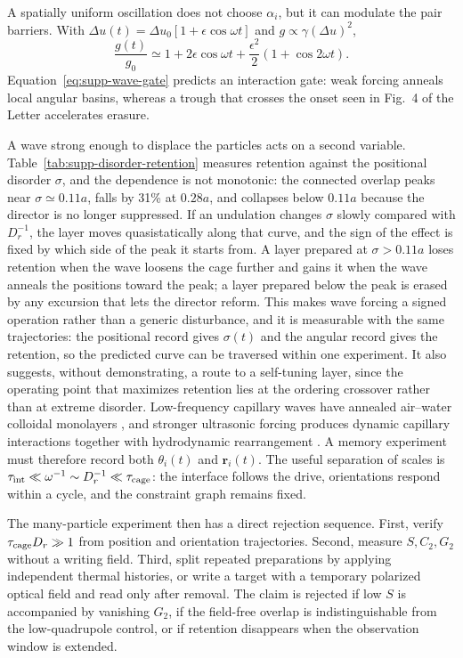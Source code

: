 \documentclass[aps,prl,onecolumn,superscriptaddress,nofootinbib]{revtex4-2}
\begin{document}
A spatially uniform oscillation does not choose \(\alpha_i\), but it can
modulate the pair barriers.  With
\(\Delta u(t)=\Delta u_0[1+\epsilon\cos\omega t]\) and
\(g\propto\gamma(\Delta u)^2\),
\begin{equation}
 \frac{g(t)}{g_0}\simeq
 1+2\epsilon\cos\omega t+
 \frac{\epsilon^2}{2}\left(1+\cos2\omega t\right).
 \label{eq:supp-wave-gate}
\end{equation}
Equation~\eqref{eq:supp-wave-gate} predicts an interaction gate: weak forcing
anneals local angular basins, whereas a trough that crosses the onset seen in
Fig.~4 of the Letter accelerates erasure.

A wave strong enough to displace the particles acts on a second variable.
Table~\ref{tab:supp-disorder-retention} measures retention against the
positional disorder \(\sigma\), and the dependence is not monotonic: the
connected overlap peaks near \(\sigma\simeq0.11a\), falls by 31\% at
\(0.28a\), and collapses below \(0.11a\) because the director is no longer
suppressed.  If an undulation changes \(\sigma\) slowly compared with
\(D_r^{-1}\), the layer moves quasistatically along that curve, and the sign
of the effect is fixed by which side of the peak it starts from.  A layer
prepared at \(\sigma>0.11a\) loses retention when the wave loosens the cage
further and gains it when the wave anneals the positions toward the peak; a
layer prepared below the peak is erased by any excursion that lets the
director reform.  This makes wave forcing a signed operation rather than a
generic disturbance, and it is measurable with the same trajectories: the
positional record gives \(\sigma(t)\) and the angular record gives the
retention, so the predicted curve can be traversed within one experiment.  It
also suggests, without demonstrating, a route to a self-tuning layer, since
the operating point that maximizes retention lies at the ordering crossover
rather than at extreme disorder.  Low-frequency capillary waves
have annealed air--water colloidal monolayers \cite{caso2025}, and stronger
ultrasonic forcing produces dynamic capillary interactions together with
hydrodynamic rearrangement \cite{huerre2018}.  A memory experiment must
therefore record both \(\theta_i(t)\) and \(\bm r_i(t)\).  The useful
separation of scales is
\(\tau_{\rm int}\ll\omega^{-1}\sim D_r^{-1}\ll\tau_{\rm cage}\): the
interface follows the drive, orientations respond within a cycle, and the
constraint graph remains fixed.

The many-particle experiment then has a direct rejection sequence.  First,
verify \(\tau_{\rm cage}D_r\gg1\) from position and orientation trajectories.
Second, measure \(S,C_2,G_2\) without a writing field.  Third, split repeated
preparations by applying independent thermal histories, or write a target
with a temporary polarized optical field and read only after removal.  The
claim is rejected if low \(S\) is accompanied by vanishing \(G_2\), if the
field-free overlap is indistinguishable from the low-quadrupole control, or
if retention disappears when the observation window is extended.
\end{document}
